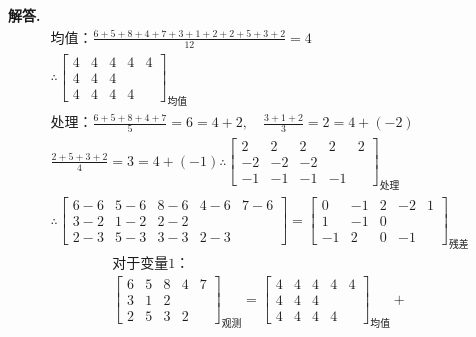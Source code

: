 \documentclass[12pt, a4paper, oneside]{ctexart}
\newenvironment{solution}{\par\noindent\textbf{解答. }}{\par}
\begin{document}
\begin{solution}
    \[
    \begin{gathered}
        \text{均值：}\frac{6+5+8+4+7+3+1+2+2+5+3+2}{12}=4\\
        \therefore  \begin{bmatrix}
            4 & 4 & 4 & 4 & 4 \\
            4 & 4 & 4 &  &  \\
            4 & 4 & 4 & 4 &
        \end{bmatrix}_{\text{均值}}\\
        \text{处理：}\frac{6+5+8+4+7}{5}=6=4+2,\quad \frac{3+1+2}{3}=2=4+(-2)\\ 
        \frac{2+5+3+2}{4}=3=4+(-1)
        \therefore   \begin{bmatrix}
            2 & 2 & 2 & 2 & 2 \\
            -2 & -2 & -2 &  &  \\
            -1 & -1 & -1 & -1 &
        \end{bmatrix}_{\text{处理}}\\
        \therefore 
        \begin{bmatrix}
            6-6 & 5-6 & 8-6 & 4-6 & 7-6 \\
            3-2 & 1-2 & 2-2 &  &  \\
            2-3 & 5-3 & 3-3 & 2-3 &
        \end{bmatrix}=
        \begin{bmatrix}
            0 & -1 & 2 & -2 & 1 \\
            1 & -1 & 0 &  &  \\
            -1 & 2 & 0 & -1 &
        \end{bmatrix}_{\text{残差}}
    \end{gathered}
    \]
    \[
    \begin{gathered}
        \text{对于变量1：}\\
        \begin{bmatrix}
            6 & 5 & 8 & 4 & 7 \\
            3 & 1 & 2 &  &  \\
            2 & 5 & 3 & 2 &  
        \end{bmatrix}_{\text{观测}}=
        \begin{bmatrix}
            4 & 4 & 4 & 4 & 4 \\
            4 & 4 & 4 &  &  \\
            4 & 4 & 4 & 4 &
        \end{bmatrix}_{\text{均值}}+

\end{gathered}\]
\end{solution}
\end{document}
